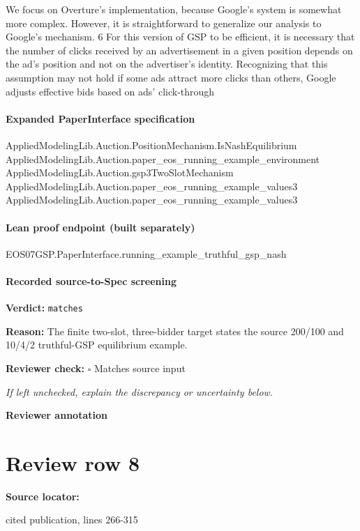 \documentclass[10pt]{article}
\newcommand{\reviewerbox}{%
  \par\noindent\fbox{\parbox{0.96\linewidth}{\rule{0pt}{0.38in}}}\par
}
\newcommand{\reviewmatch}[1]{%
  \par\noindent\textbf{Reviewer check:} $\square$\; #1\par
  \noindent\emph{If left unchecked, explain the discrepancy or uncertainty below.}\par
}
\begin{document}
\begin{ReviewVerbatim}
We focus on Overture’s implementation, because Google’s system is somewhat more complex. However, it is
straightforward to generalize our analysis to Google’s mechanism.
6
For this version of GSP to be efficient, it is necessary that the number of clicks received by an advertisement in
a given position depends on the ad’s position and not on the advertiser’s identity. Recognizing that this assumption
may not hold if some ads attract more clicks than others, Google adjusts effective bids based on ads’ click-through
\end{ReviewVerbatim}



\paragraph{Expanded PaperInterface specification}
\begin{ReviewVerbatim}
AppliedModelingLib.Auction.PositionMechanism.IsNashEquilibrium
  AppliedModelingLib.Auction.paper_eos_running_example_environment AppliedModelingLib.Auction.gsp3TwoSlotMechanism
  AppliedModelingLib.Auction.paper_eos_running_example_values3
  AppliedModelingLib.Auction.paper_eos_running_example_values3
\end{ReviewVerbatim}



\paragraph{Lean proof endpoint (built separately)}\begin{ReviewVerbatim}
EOS07GSP.PaperInterface.running_example_truthful_gsp_nash
\end{ReviewVerbatim}

\paragraph{Recorded source-to-Spec screening}
\textbf{Verdict:} \texttt{matches}
\\
{\raggedright
\textbf{Reason:} The finite two-\allowbreak{}slot, three-\allowbreak{}bidder target states the source 200/\allowbreak{}100 and 10/\allowbreak{}4/\allowbreak{}2 truthful-\allowbreak{}GSP equilibrium example.\allowbreak{}
\par}
\reviewmatch{Matches source input}
\noindent\textbf{Reviewer annotation}\par
\reviewerbox
\clearpage
\hypertarget{source-claim-110a524c6dbd4f91}{}
\section*{Review row 8}
\textbf{Source locator:} {\footnotesize\raggedright cited publication, lines 266-\allowbreak{}315\par}
\end{document}
